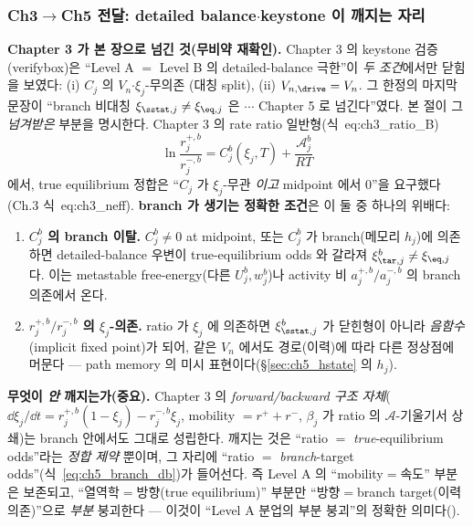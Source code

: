\subsubsection{Ch3$\to$Ch5 전달: detailed balance$\cdot$keystone 이 깨지는 자리}\label{sec:ch5_dbbreak}
\textbf{Chapter 3 가 본 장으로 넘긴 것(무비약 재확인).} Chapter 3 의 keystone 검증(verifybox)은 ``Level A $=$
Level B 의 detailed-balance 극한''이 \emph{두 조건}에서만 닫힘을 보였다: (i) $C_j$ 의 $V_n$$\cdot$$\xi_j$-무의존
(대칭 split), (ii) $V_{n,\drive}=V_n$. 그 한정의 마지막 문장이 ``branch 비대칭 $\xi_{\sstat,j}\ne\xi_{\eq,j}$
은 $\cdots$ Chapter 5 로 넘긴다''였다. 본 절이 그 \emph{넘겨받은} 부분을 명시한다. Chapter 3 의 rate ratio
일반형(식~eq:ch3\_ratio\_B)
\begin{equation}
\ln\frac{r_j^{+,b}}{r_j^{-,b}}=C_j^b(\xi_j,T)+\frac{\mathcal A_j^b}{RT}
\label{eq:ch5_ratio_branch}
\end{equation}
에서, true equilibrium 정합은 ``$C_j$ 가 $\xi_j$-무관 \emph{이고} midpoint 에서 0''을 요구했다(Ch.3
식~eq:ch3\_neff). \textbf{branch 가 생기는 정확한 조건}은 이 둘 중 하나의 위배다:
\begin{enumerate}[label=(\alph*),leftmargin=2.2em]
\item \textbf{$C_j^b$ 의 branch 이탈.} $C_j^b\ne0$ at midpoint, 또는 $C_j^b$ 가 branch(메모리 $h_j$)에 의존하면
  detailed-balance 우변이 true-equilibrium odds 와 갈라져 $\xi_{\tar,j}^b\ne\xi_{\eq,j}$ 다. 이는 metastable
  free-energy(다른 $U_j^b,w_j^b$)나 activity 비 $a_j^{+,b}/a_j^{-,b}$ 의 branch 의존에서 온다.
\item \textbf{$r_j^{+,b}/r_j^{-,b}$ 의 $\xi_j$-의존.} ratio 가 $\xi_j$ 에 의존하면 $\xi_{\sstat,j}^b$ 가
  닫힌형이 아니라 \emph{음함수}(implicit fixed point)가 되어, 같은 $V_n$ 에서도 경로(이력)에 따라 다른 정상점에
  머문다 — path memory 의 미시 표현이다(\S\ref{sec:ch5_hstate} 의 $h_j$).
\end{enumerate}
\textbf{무엇이 \emph{안} 깨지는가(중요).} Chapter 3 의 \emph{forward/backward 구조 자체}($\dd\xi_j/\dd t=
r_j^{+,b}(1-\xi_j)-r_j^{-,b}\xi_j$, mobility $=r^++r^-$, $\beta_j$ 가 ratio 의 $\mathcal A$-기울기서 상쇄)는
branch 안에서도 그대로 성립한다. 깨지는 것은 ``ratio $=$ \emph{true}-equilibrium odds''라는 \emph{정합 제약}
뿐이며, 그 자리에 ``ratio $=$ \emph{branch}-target odds''(식~\eqref{eq:ch5_branch_db})가 들어선다. 즉 Level A
의 ``mobility$=$속도'' 부분은 보존되고, ``열역학$=$방향(true equilibrium)'' 부분만 ``방향$=$branch target(이력
의존)''으로 \emph{부분} 붕괴한다 — 이것이 ``Level A 분업의 부분 붕괴''의 정확한 의미다().

